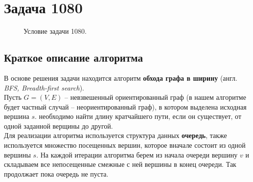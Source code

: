 \documentclass[a5paper, 10pt]{article}
\theoremstyle{definition}
\theoremstyle{plain}
\theoremstyle{remark}
\begin{document}
\newpage
\section{Задача 1080}

\begin{figure}[h!]
\caption{Условие задачи 1080.}
\end{figure}

\subsection{Краткое описание алгоритма}

В основе решения задачи находится алгоритм \textbf{обхода графа в ширину} (англ. \textit{BFS, Breadth-first search}).\\

Пусть $G=\left(V, E\right)$ -- невзвешенный ориентированный граф (в нашем алгоритме будет частный случай -- неориентированный граф), в котором выделена исходная вершина $s$. необходимо найти длину кратчайшего пути, если он существует, от одной заданной верщины до другой.\\

Для реализации алгоритма используется структура данных \textbf{очередь}, также используется множество посещенных вершин, которое вначале состоит из одной вершины $s$. На каждой итерации алгоритма берем из начала очереди вершину $v$ и складываем все непосещенные смежные с ней вершины в конец очереди. Так продолжает пока очередь не пуста.\\
\end{document}
